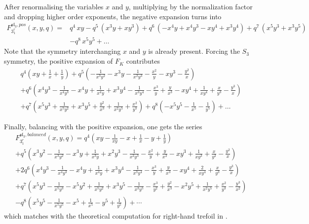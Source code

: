 \documentclass[12pt,oneside,reqno]{amsart}
\numberwithin{teorema}{section}
\numberwithin{definicion}{section}
\numberwithin{lema}{section}
\numberwithin{conjetura}{section}
\numberwithin{proposicion}{section}
\def\sl{\mathfrak{sl}}
\begin{document}
After renormalising the variables $x$ and $y$, multiplying by the normalization factor and dropping higher order exponents, the negative expansion turns into
\begin{equation*}
\begin{split}
    F_{3_1^r}^{\sl_3,pos}(x,y,q)= &q^4\, x y - q^5\, (x^3 y +x y^3) + q^6\, (-x^4 y + x^4 y^3 -x y^4 + x^3 y^4) + 
 q^7 \,(x^5 y^3 + x^3 y^5) \\&- q^8\,x^5 y^5 + \dots
\end{split}
\end{equation*}
Note that the symmetry interchanging $x$ and $y$ is already present. Forcing the $S_3$ symmetry, the positive expansion of $F_K$ contributes
\begin{equation*}
    \begin{split}
        &q^4 \left(x y+\frac{1}{x}+\frac{1}{y}\right) + q^5 \left(-\frac{1}{x^3 y^2}-x^3 y-\frac{1}{x^2 y^3}-\frac{x^2}{y}-x y^3-\frac{y^2}{x}\right) \\
        &+ q^6 \left(x^4 y^3-\frac{1}{x^4 y^3}-x^4 y+\frac{1}{x^4 y}+x^3 y^4-\frac{1}{x^3 y^4}-\frac{x^3}{y}+\frac{y}{x^3}-x y^4+\frac{1}{x y^4}+\frac{x}{y^3}-\frac{y^3}{x}\right) \\
        &+ q^7 \left(x^5 y^3+\frac{1}{x^5 y^2}+x^3 y^5+\frac{y^2}{x^3}+\frac{1}{x^2 y^5}+\frac{x^2}{y^3}\right) + q^8 \left(-x^5 y^5-\frac{1}{x^5}-\frac{1}{y^5}\right) + \dots
    \end{split}
\end{equation*}

Finally, balancing with the positive expansion, one gets the series
\begin{equation*}
    \begin{split}
        &F_{3_1^r}^{\sl_3,balanced}(x,y,q) = q^4 \left(x y-\frac{1}{x y}-x+\frac{1}{x}-y+\frac{1}{y}\right) \\
        &+ q^5 \left(x^3 y^2-\frac{1}{x^3 y^2}-x^3 y+\frac{1}{x^3 y}+x^2 y^3-\frac{1}{x^2 y^3}-\frac{x^2}{y}+\frac{y}{x^2}-x y^3+\frac{1}{x y^3}+\frac{x}{y^2}-\frac{y^2}{x}\right) \\
        &+ 2q^6 \left( x^4 y^3-\frac{1}{x^4 y^3}- x^4 y+\frac{1}{x^4 y}+ x^3 y^4-\frac{1}{x^3 y^4}-\frac{x^3}{y}+\frac{y}{x^3}- x y^4+\frac{2}{x y^4}+\frac{x}{y^3}-\frac{ y^3}{x}\right) \\
        &+ q^7 \left(x^5 y^3-\frac{1}{x^5 y^3}-x^5 y^2+\frac{1}{x^5 y^2}+x^3 y^5-\frac{1}{x^3 y^5}-\frac{x^3}{y^2}+\frac{y^2}{x^3}-x^2 y^5+\frac{1}{x^2 y^5}+\frac{x^2}{y^3}-\frac{y^3}{x^2}\right) \\
        &- q^8 \left( x^5 y^5-\frac{1}{x^5 y^5}-x^5+\frac{1}{x^5}-y^5+\frac{1}{y^5}\right) + \cdots
    \end{split}
\end{equation*}
which matches with the theoretical computation for right-hand trefoil in \cite{Park20}.
\end{document}
